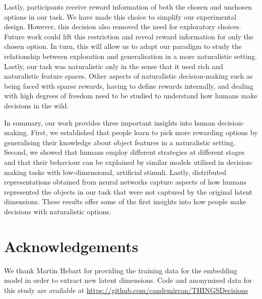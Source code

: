 \documentclass[10pt]{article}
\begin{document}
Lastly, participants receive reward information of both the chosen and unchosen options in our task. We have made this choice to simplify our experimental design. However, this decision also removed the need for exploratory choices. Future work could lift this restriction and reveal reward information for only the chosen option. In turn, this will allow us to adapt our paradigm to study the relationship between exploration and generalisation \citep{wu_generalization_2018} in a more naturalistic setting. Lastly, our task was naturalistic only in the sense that it used rich and naturalistic feature spaces. Other aspects of naturalistic decision-making such as being faced with sparse rewards, having to define rewards internally, and dealing with high degrees of freedom need to be studied to understand how humans make decisions in the wild.

In summary, our work provides three important insights into human decision-making. First, we established that people learn to pick more rewarding options by generalising their knowledge about object features in a naturalistic setting. Second, we showed that humans employ different strategies at different stages and that their behaviour can be explained by similar models utilised in decision-making tasks with low-dimensional, artificial stimuli. Lastly, distributed representations obtained from neural networks capture aspects of how humans represented the objects in our task that were not captured by the original latent dimensions. These results offer some of the first insights into how people make decisions with naturalistic options.


\section{Acknowledgements}

We thank Martin Hebart for providing the training data for the embedding model in order to extract new latent dimensions. Code and anonymised data for this study are available at \url{https://github.com/candemircan/THINGSDecisions}


\setlength{\bibleftmargin}{.125in}
\setlength{\bibindent}{-\bibleftmargin}


\end{document}
